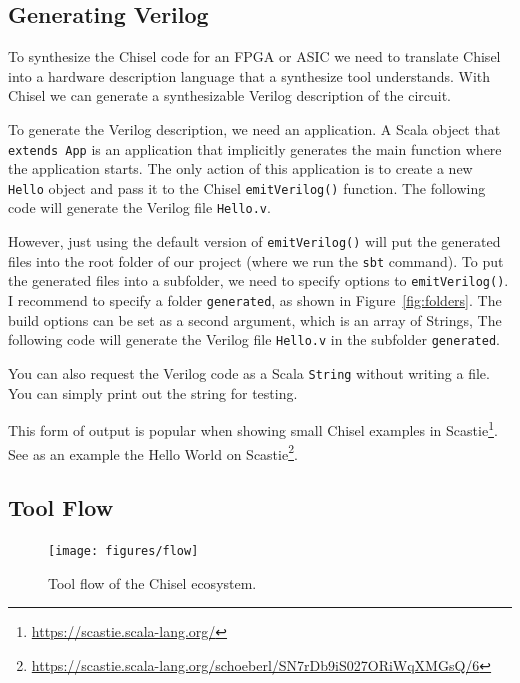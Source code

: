 \documentclass[%
    10pt,
    headinclude, footexclude,
    openright, %
    notitlepage,
    cleardoubleempty,
    headsepline,
    pointlessnumbers,
    bibtotoc, idxtotoc,
    ]{scrbook}
\newcommand{\code}[1]{{\small{\texttt{#1}}}}
\newcommand{\myref}[2]{\href{#1}{#2}}
\renewcommand{\myref}[2]{{#2}{\footnote{\url{#1}}}}
\begin{document}
\subsection{Generating Verilog}


To synthesize the Chisel code for an FPGA or ASIC we need to translate Chisel into
a hardware description language that a synthesize tool understands.
With Chisel we can generate a synthesizable Verilog description of the circuit.

To generate the Verilog description, we need an application. A Scala object that \code{extends App}
is an application that implicitly generates the main function where the application starts.
The only action of this application is to create a new \code{Hello} object and pass it
to the Chisel \code{emitVerilog()} function.
The following code will generate the Verilog file \code{Hello.v}.


However, just using the default version of \code{emitVerilog()} will put the generated files
into the root folder of our project (where we run the \code{sbt} command).
To put the generated files into a subfolder, we need to specify options to \code{emitVerilog()}.
I recommend to specify a folder \code{generated}, as shown in Figure~\ref{fig:folders}.
The build options can be set as a second argument, which is an array of Strings,
The following code will generate the Verilog file \code{Hello.v} in the subfolder \code{generated}. 


You can also request the Verilog code as a Scala \code{String} without writing a file.
You can simply print out the string for testing.


\noindent This form of output is popular when showing small Chisel examples in
\myref{https://scastie.scala-lang.org/}{Scastie}. See as an example the
\myref{https://scastie.scala-lang.org/schoeberl/SN7rDb9iS027ORiWqXMGsQ/6}{Hello World on Scastie}.


\subsection{Tool Flow}

\begin{figure}
  \centering
  \texttt{[image: figures/flow]}
  \caption{Tool flow of the Chisel ecosystem.}
  \label{fig:flow}
\end{figure}
\end{document}
